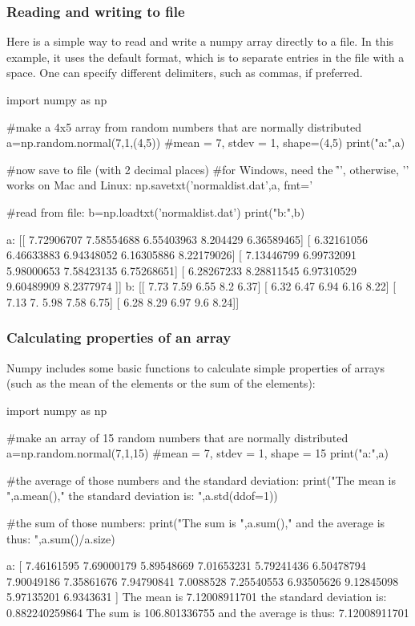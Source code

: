 \subsubsection{Reading and writing to file}
Here is a simple way to read and write a numpy array directly to a file. In this example, it uses the default format, which is to separate entries in the file with a space. One can specify different delimiters, such as commas, if preferred.
\begin{python}[caption = \mbox{}]
import numpy as np

#make a 4x5 array from random numbers that are normally distributed
a=np.random.normal(7,1,(4,5)) #mean = 7, stdev = 1, shape=(4,5)
print("a:\n",a)

#now save to file (with 2 decimal places)
#for Windows, need the '\r\n', otherwise, '\n' works on Mac and Linux:
np.savetxt('normaldist.dat',a, fmt='%

#read from file:
b=np.loadtxt('normaldist.dat')
print("b:\n",b)
\end{python} 
\begin{poutput}
a:
 [[ 7.72906707  7.58554688  6.55403963  8.204429    6.36589465]
 [ 6.32161056  6.46633883  6.94348052  6.16305886  8.22179026]
 [ 7.13446799  6.99732091  5.98000653  7.58423135  6.75268651]
 [ 6.28267233  8.28811545  6.97310529  9.60489909  8.2377974 ]]
b:
 [[ 7.73  7.59  6.55  8.2   6.37]
 [ 6.32  6.47  6.94  6.16  8.22]
 [ 7.13  7.    5.98  7.58  6.75]
 [ 6.28  8.29  6.97  9.6   8.24]]
\end{poutput}

\subsubsection{Calculating properties of an array}
Numpy includes some basic functions to calculate simple properties of arrays (such as the mean of the elements or the sum of the elements):
\begin{python}[caption = \mbox{}]
import numpy as np

#make an array of 15 random numbers that are normally distributed
a=np.random.normal(7,1,15) #mean = 7, stdev = 1, shape = 15
print("a:\n",a)

#the average of those numbers and the standard deviation:
print("The mean is ",a.mean()," the standard deviation is: ",a.std(ddof=1))

#the sum of those numbers:
print("The sum is ",a.sum()," and the average is thus: ",a.sum()/a.size)
\end{python} 
\begin{poutput}
a:
 [ 7.46161595  7.69000179  5.89548669  7.01653231  5.79241436  6.50478794
  7.90049186  7.35861676  7.94790841  7.0088528   7.25540553  6.93505626
  9.12845098  5.97135201  6.9343631 ]
The mean is  7.12008911701  the standard deviation is:  0.882240259864
The sum is  106.801336755  and the average is thus:  7.12008911701
\end{poutput}

